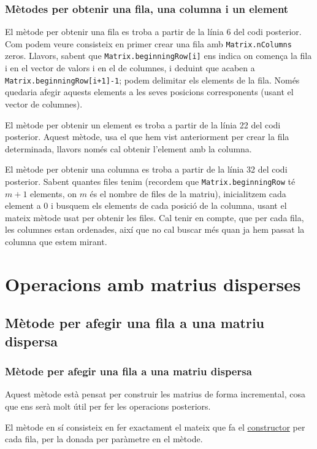 \documentclass[8pt]{beamer}
\begin{document}
\begin{frame}
  \frametitle{Mètodes per obtenir una fila, una columna i un element}
  El mètode per obtenir una fila es troba a partir de la línia 6 del codi posterior. Com podem veure consisteix en primer crear una fila amb \texttt{Matrix.nColumns} zeros.
Llavors, sabent que \texttt{Matrix.beginningRow[i]} ens indica on comença la fila i en el vector de valors i en el de columnes, i deduint que acaben a \texttt{Matrix.beginningRow[i+1]-1}; podem delimitar els elements de la fila. Només quedaria afegir aquests elements a les seves posicions corresponents (usant el vector de columnes).

El mètode per obtenir un element es troba a partir de la línia 22 del codi posterior. Aquest mètode, usa el que hem vist anteriorment per crear la fila determinada, llavors només cal obtenir l'element amb la columna.

El mètode per obtenir una columna es troba a partir de la línia 32 del codi posterior. Sabent quantes files tenim (recordem que \texttt{Matrix.beginningRow} té $m+1$ elements, on $m$ és el nombre de files de la matriu), inicialitzem cada element a 0 i busquem els elements de cada posició de la columna, usant el mateix mètode usat per obtenir les files. Cal tenir en compte, que per cada fila, les columnes estan ordenades, així que no cal buscar més quan ja hem passat la columna que estem mirant.  
\end{frame}

\begin{frame}
    
\end{frame}

\begin{frame}
    
\end{frame}


\begin{frame}
    
\end{frame}
  
\section{Operacions amb matrius disperses}
\subsection[Afegir Fila]{Mètode per afegir una fila a una matriu dispersa}
\begin{frame}
  \frametitle{Mètode per afegir una fila a una matriu dispersa}
  
  Aquest mètode està pensat per construir les matrius de forma incremental, cosa que ens serà molt útil per fer les operacions posteriors.
  
  El mètode en sí consisteix en fer exactament el mateix que fa el \hyperlink{Constructor}{constructor} per cada fila, per la donada per paràmetre en el mètode. 
\end{frame}
\end{document}
